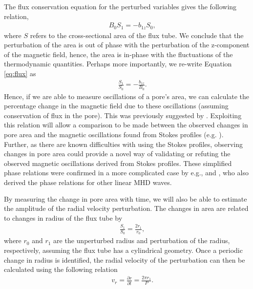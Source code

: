     The flux conservation equation for the perturbed variables gives the following relation,
    \begin{align}
        &&B_0S_1=-b_{1z}S_0,
        \label{eq:flux}
    \end{align}
    where $S$ refers to the cross-sectional area of the flux tube.
    We conclude that the perturbation of the area is out of phase with the perturbation of the  z-component of the magnetic field, hence, the area is in-phase with the fluctuations of the thermodynamic quantities.
    Perhaps more importantly, we re-write Equation \ref{eq:flux} as
    \begin{align}
        &&\frac{S_1}{S_0}=-\frac{b_{1z}}{B_0}.
        \label{eq:mag_area}
    \end{align}
    Hence, if we are able to measure oscillations of a pore's area, we can calculate the percentage change in the magnetic field due to these oscillations (assuming conservation of flux in the pore).
    This was previously suggested by \cite{0004-637X-806-1-132}.
    Exploiting this relation will allow a comparison to be made between the observed changes in pore area and the magnetic oscillations found from Stokes profiles (e.g. \citealp{Balthasar2000}).
    Further, as there are known difficulties with using the Stokes profiles, observing changes in pore area could provide a novel way of validating or refuting the observed magnetic oscillations derived from Stokes profiles.
    These simplified phase relations were confirmed in a more complicated case by e.g., \cite{Moreels2013} and \cite{Moreels2013b}, who also derived the phase relations for other linear MHD waves. 
    
    By measuring the change in pore area with time, we will also be able to estimate the amplitude of the radial velocity perturbation.
    The changes in area are related to changes in radius of the flux tube by
    \begin{align}
        &&\frac{S_1}{S_0}=\frac{2r_1}{r_0},
        \label{eq:area_rad}
    \end{align}
    where $r_0$ and $r_1$ are the unperturbed radius and perturbation of the radius, respectively, assuming the flux tube has a cylindrical geometry.
    Once a periodic change in radius is identified, the radial velocity of the perturbation can then be calculated using the following relation
    \begin{align}
        &&v_r=\frac{\partial r}{\partial t}=\frac{2\pi r_1}{P}.
        \label{eq:rad_vel}
    \end{align}
  
